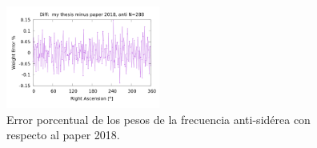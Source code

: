 \begin{figure}[H]
	\centering
	\includegraphics[width=0.45\textwidth]{anti_my_and_paper_in_288_error.png}
	\caption{Error porcentual de los pesos de la frecuencia anti-sidérea con respecto al paper 2018.}
	\label{fig:error_288_anti}
\end{figure}


